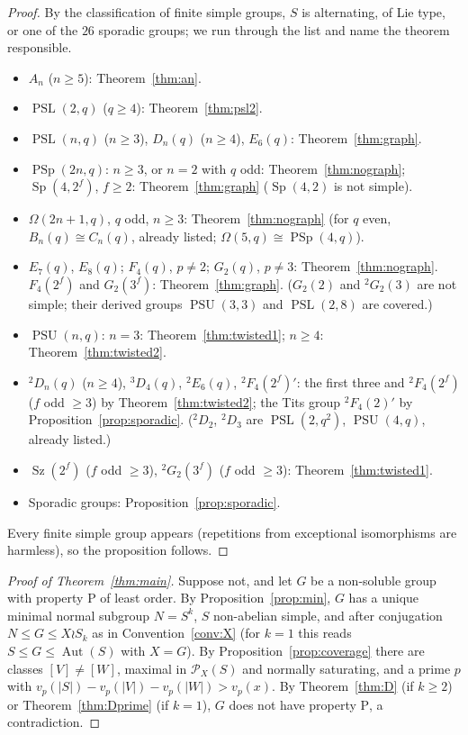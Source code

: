 \documentclass[11pt]{amsart}
\theoremstyle{definition}
\theoremstyle{remark}
\DeclareMathOperator{\Aut}{Aut}
\DeclareMathOperator{\PSL}{PSL}
\DeclareMathOperator{\PSU}{PSU}
\DeclareMathOperator{\PSp}{PSp}
\DeclareMathOperator{\Sp}{Sp}
\DeclareMathOperator{\Sz}{Sz}
\newcommand{\Pos}{\mathcal{P}}
\newcommand{\vp}[1]{v_{#1}}
\begin{document}
\begin{proof}
By the classification of finite simple groups, $S$ is alternating,
of Lie type, or one of the $26$ sporadic groups; we run through the
list and name the theorem responsible.
\begin{itemize}
\item $A_n$ ($n\geq5$): Theorem~\ref{thm:an}.
\item $\PSL(2,q)$ ($q\geq4$): Theorem~\ref{thm:psl2}.
\item $\PSL(n,q)$ ($n\geq3$), $D_n(q)$ ($n\geq4$), $E_6(q)$:
Theorem~\ref{thm:graph}.
\item $\PSp(2n,q)$: $n\geq3$, or $n=2$ with $q$ odd:
Theorem~\ref{thm:nograph}; $\Sp(4,2^f)$, $f\geq2$:
Theorem~\ref{thm:graph} ($\Sp(4,2)$ is not simple).
\item $\Omega(2n{+}1,q)$, $q$ odd, $n\geq3$: Theorem~\ref{thm:nograph}
(for $q$ even, $B_n(q)\cong C_n(q)$, already listed;
$\Omega(5,q)\cong\PSp(4,q)$).
\item $E_7(q)$, $E_8(q)$; $F_4(q)$, $p\neq2$; $G_2(q)$, $p\neq3$:
Theorem~\ref{thm:nograph}. $F_4(2^f)$ and $G_2(3^f)$:
Theorem~\ref{thm:graph}. ($G_2(2)$ and ${}^2G_2(3)$ are not simple;
their derived groups $\PSU(3,3)$ and $\PSL(2,8)$ are covered.)
\item $\PSU(n,q)$: $n=3$: Theorem~\ref{thm:twisted1}; $n\geq4$:
Theorem~\ref{thm:twisted2}.
\item ${}^2D_n(q)$ ($n\geq4$), ${}^3D_4(q)$, ${}^2E_6(q)$,
${}^2F_4(2^f)'$: the first three and ${}^2F_4(2^f)$ ($f$ odd $\geq3$)
by Theorem~\ref{thm:twisted2}; the Tits group ${}^2F_4(2)'$ by
Proposition~\ref{prop:sporadic}. (${}^2D_2$, ${}^2D_3$ are
$\PSL(2,q^2)$, $\PSU(4,q)$, already listed.)
\item $\Sz(2^f)$ ($f$ odd $\geq3$), ${}^2G_2(3^f)$ ($f$ odd $\geq3$):
Theorem~\ref{thm:twisted1}.
\item Sporadic groups: Proposition~\ref{prop:sporadic}.
\end{itemize}
Every finite simple group appears (repetitions from exceptional
isomorphisms are harmless), so the proposition follows.
\end{proof}

\begin{proof}[Proof of Theorem~\ref{thm:main}]
Suppose not, and let $G$ be a non-soluble group with property
$\mathrm{P}$ of least order. By Proposition~\ref{prop:min}, $G$ has a
unique minimal normal subgroup $N=S^k$, $S$ non-abelian simple, and
after conjugation $N\leq G\leq X\wr S_k$ as in Convention~\ref{conv:X}
(for $k=1$ this reads $S\leq G\leq\Aut(S)$ with $X=G$). By
Proposition~\ref{prop:coverage} there are classes
$[V]\neq[W]$, maximal in $\Pos_X(S)$ and normally saturating, and a
prime $p$ with $\vp{p}(|S|)-\vp{p}(|V|)-\vp{p}(|W|)>\vp{p}(x)$. By
Theorem~\ref{thm:D} (if $k\geq2$) or Theorem~\ref{thm:Dprime} (if
$k=1$), $G$ does not have property $\mathrm{P}$, a contradiction.
\end{proof}
\end{document}
